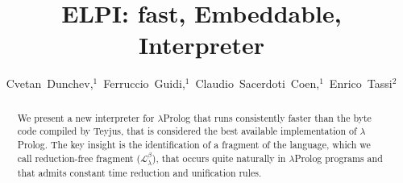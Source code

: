 \documentclass{llncs}
\begin{document}
\title{ELPI: fast, Embeddable, \lp{} Interpreter}





\author{Cvetan~Dunchev,$^1$~Ferruccio~Guidi,$^1$~Claudio~Sacerdoti~Coen,$^1$~Enrico~Tassi$^2$}






\newcommand{\frag}{Reduction-Free Fragment}
\newcommand{\lp}{$\lambda$Prolog}
\newcommand{\Ll}{\ensuremath{\mathcal{L}_\lambda}}
\newcommand{\rff}{\ensuremath{\mathcal{L}_\lambda^\beta}}
\newcommand{\elpi}{ELPI}
\newcommand{\tedius}{Teyjus}
\newcommand{\CSC}[1]{\textcolor{red}{#1}}
\newcommand{\FG}[1]{\textcolor{magenta}{#1}}

\maketitle

\begin{abstract}
We present a new interpreter for \lp{} that runs consistently faster than
the byte code compiled by \tedius{}, that is considered the best
available implementation of \lp. 
The key insight is the identification of a fragment of
the language, which we call reduction-free fragment (\rff{}),
that occurs quite naturally in \lp{}
programs and that admits constant time reduction and unification rules.
\end{abstract}
\end{document}
